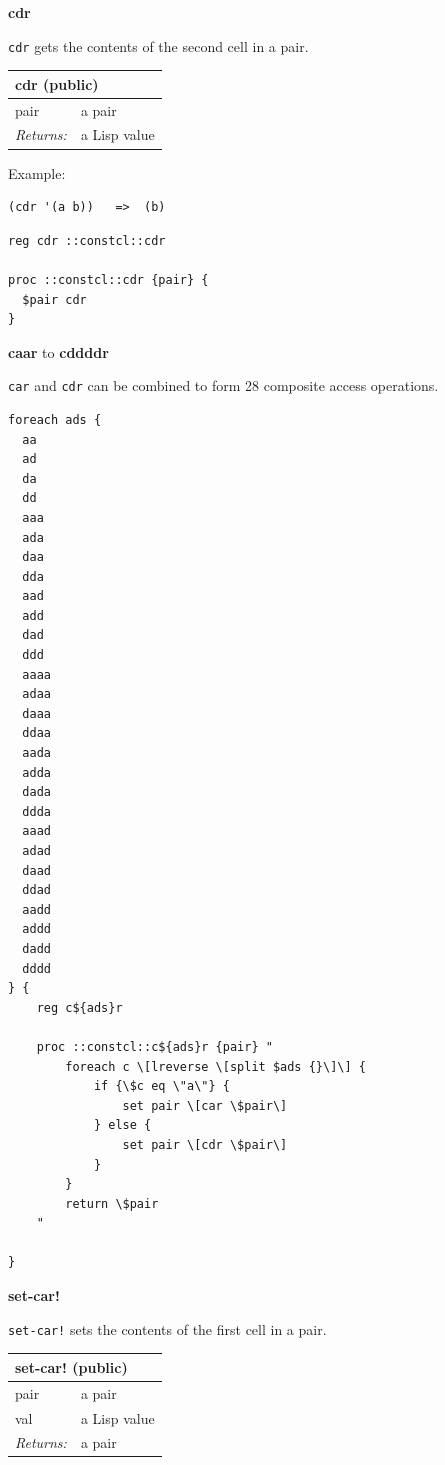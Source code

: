 \documentclass[twoside,9pt]{report}
\begin{document}
\textbf{cdr}


\texttt{cdr} gets the contents of the second cell in a pair.

\begin{tabular}{ |l l| }
\hline
\multicolumn{2}{|l|}{cdr (public)} \\
\hline
pair & a pair \\
\textit{Returns:} & a Lisp value \\
\hline
\end{tabular}


Example:

\noindent\makebox[\linewidth]{\rule{\linewidth}{0.4pt}}
\begin{lstlisting}
(cdr '(a b))   =>  (b)
\end{lstlisting}
\noindent\makebox[\linewidth]{\rule{\linewidth}{0.4pt}}
\noindent\makebox[\linewidth]{\rule{\linewidth}{0.4pt}}
\begin{lstlisting}
reg cdr ::constcl::cdr
 
proc ::constcl::cdr {pair} {
  $pair cdr
}
\end{lstlisting}
\noindent\makebox[\linewidth]{\rule{\linewidth}{0.4pt}}

\textbf{caar} to \textbf{cddddr}


\texttt{car} and \texttt{cdr} can be combined to form 28 composite access operations.

\noindent\makebox[\linewidth]{\rule{\linewidth}{0.4pt}}
\begin{lstlisting}
foreach ads {
  aa
  ad
  da
  dd
  aaa
  ada
  daa
  dda
  aad
  add
  dad
  ddd
  aaaa
  adaa
  daaa
  ddaa
  aada
  adda
  dada
  ddda
  aaad
  adad
  daad
  ddad
  aadd
  addd
  dadd
  dddd
} {
    reg c${ads}r
 
    proc ::constcl::c${ads}r {pair} "
        foreach c \[lreverse \[split $ads {}\]\] {
            if {\$c eq \"a\"} {
                set pair \[car \$pair\]
            } else {
                set pair \[cdr \$pair\]
            }
        }
        return \$pair
    "
 
}
\end{lstlisting}
\noindent\makebox[\linewidth]{\rule{\linewidth}{0.4pt}}

\textbf{set-car!}


\texttt{set-car!} sets the contents of the first cell in a pair.

\begin{tabular}{ |l l| }
\hline
\multicolumn{2}{|l|}{set-car! (public)} \\
\hline
pair & a pair \\
val & a Lisp value \\
\textit{Returns:} & a pair \\
\hline
\end{tabular}
\end{document}
